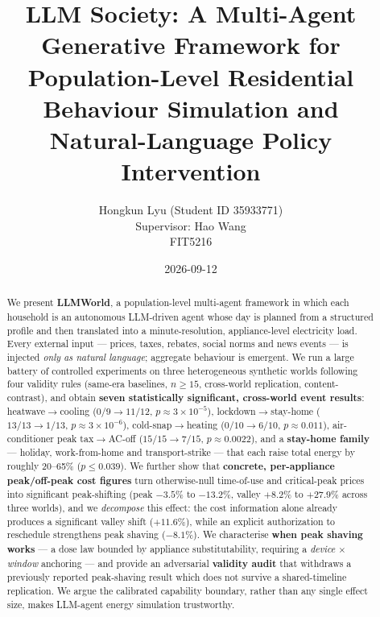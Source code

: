 \documentclass[11pt]{article}
\title{\bfseries LLM Society: A Multi-Agent Generative Framework for\\
Population-Level Residential Behaviour Simulation and\\
Natural-Language Policy Intervention}
\author{Hongkun Lyu (Student ID 35933771) \\ Supervisor: Hao Wang \\ \small FIT5216}
\date{2026-09-12}
\begin{document}
\maketitle

\begin{abstract}
\noindent
We present \textbf{LLMWorld}, a population-level multi-agent framework in which each household is an
autonomous LLM-driven agent whose day is planned from a structured profile and then translated into a
minute-resolution, appliance-level electricity load. Every external input --- prices, taxes, rebates,
social norms and news events --- is injected \emph{only as natural language}; aggregate behaviour is
emergent. We run a large battery of controlled experiments on three heterogeneous synthetic worlds
following four validity rules (same-era baselines, $n\ge 15$, cross-world replication, content-contrast),
and obtain \textbf{seven statistically significant, cross-world event results}: heatwave$\rightarrow$cooling
($0/9\rightarrow 11/12$, $p\approx 3\times10^{-5}$), lockdown$\rightarrow$stay-home
($13/13\rightarrow 1/13$, $p\approx 3\times10^{-6}$), cold-snap$\rightarrow$heating ($0/10\rightarrow 6/10$,
$p\approx 0.011$), air-conditioner peak tax$\rightarrow$AC-off ($15/15\rightarrow 7/15$, $p\approx 0.0022$),
and a \textbf{stay-home family} --- holiday, work-from-home and transport-strike --- that each raise total
energy by roughly 20--65\% ($p\le 0.039$). We further show that \textbf{concrete, per-appliance
peak/off-peak cost figures} turn otherwise-null time-of-use and critical-peak prices into significant
peak-shifting (peak $-3.5\%$ to $-13.2\%$, valley $+8.2\%$ to $+27.9\%$ across three worlds), and we
\emph{decompose} this effect: the cost information alone already produces a significant valley shift
($+11.6\%$), while an explicit authorization to reschedule strengthens peak shaving ($-8.1\%$). We
characterise \textbf{when peak shaving works} --- a dose law bounded by appliance substitutability,
requiring a \emph{device} $\times$ \emph{window} anchoring --- and provide an adversarial \textbf{validity
audit} that withdraws a previously reported peak-shaving result which does not survive a shared-timeline
replication. We argue the calibrated capability boundary, rather than any single effect size, makes
LLM-agent energy simulation trustworthy.
\end{abstract}
\end{document}
